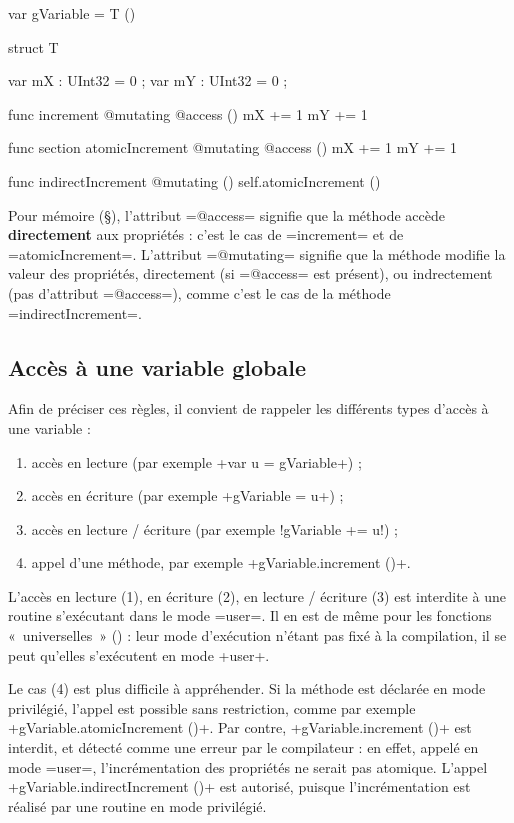 \begin{OMNIBUS}
var gVariable = T ()

struct T {
  var mX : UInt32 = 0 ;
  var mY : UInt32 = 0 ;
  
  func increment @mutating @access () {
    mX += 1
    mY += 1
  }

  func section atomicIncrement @mutating @access () {
    mX += 1
    mY += 1
  }

  func indirectIncrement @mutating () {
    self.atomicIncrement ()
  }
}
\end{OMNIBUS}

Pour mémoire (§), l'attribut \omnibus=@access= signifie que la méthode accède {\bf directement} aux propriétés : c'est le cas de \omnibus=increment= et de \omnibus=atomicIncrement=. L'attribut \omnibus=@mutating= signifie que la méthode modifie la valeur des propriétés, directement (si \omnibus=@access= est présent), ou indrectement (pas d'attribut \omnibus=@access=), comme c'est le cas de la méthode \omnibus=indirectIncrement=.

\subsection{Accès à une variable globale}


Afin de préciser ces règles, il convient de rappeler les différents types d'accès à une variable :
\begin{enumerate}[label=(\arabic*)]
  \item accès en lecture (par exemple \omnibus+var u = gVariable+) ;
  \item accès en écriture (par exemple \omnibus+gVariable = u+) ;
  \item accès en lecture / écriture (par exemple \omnibus!gVariable += u!) ;
  \item appel d'une méthode, par exemple \omnibus+gVariable.increment ()+.
\end{enumerate}

L'accès en lecture (1), en écriture (2), en lecture / écriture (3) est interdite à une routine s'exécutant dans le mode \omnibus=user=. Il en est de même pour les fonctions «~universelles~» () : leur mode d'exécution n'étant pas fixé à la compilation, il se peut qu'elles s'exécutent en mode \omnibus+user+.

Le cas (4) est plus difficile à appréhender. Si la méthode est déclarée en mode privilégié, l'appel est possible sans restriction, comme par exemple \omnibus+gVariable.atomicIncrement ()+. Par contre, \omnibus+gVariable.increment ()+ est interdit, et détecté comme une erreur par le compilateur : en effet, appelé en mode \omnibus=user=, l'incrémentation des propriétés ne serait pas atomique. L'appel \omnibus+gVariable.indirectIncrement ()+ est autorisé, puisque l'incrémentation est réalisé par une routine en mode privilégié.

